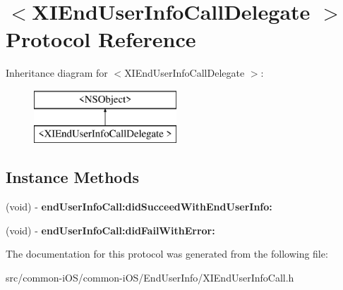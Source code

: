 \hypertarget{protocol_x_i_end_user_info_call_delegate_01-p}{}\section{$<$X\+I\+End\+User\+Info\+Call\+Delegate $>$ Protocol Reference}
\label{protocol_x_i_end_user_info_call_delegate_01-p}
Inheritance diagram for $<$X\+I\+End\+User\+Info\+Call\+Delegate $>$\+:\begin{figure}[H]
\begin{center}
\leavevmode
\includegraphics[height=2.000000cm]{protocol_x_i_end_user_info_call_delegate_01-p}
\end{center}
\end{figure}
\subsection*{Instance Methods}
\begin{DoxyCompactItemize}
\item 
\hypertarget{protocol_x_i_end_user_info_call_delegate_01-p_adfc089c81e0ddc50514f1074d048017d}{}\label{protocol_x_i_end_user_info_call_delegate_01-p_adfc089c81e0ddc50514f1074d048017d} 
(void) -\/ {\bfseries end\+User\+Info\+Call\+:did\+Succeed\+With\+End\+User\+Info\+:}
\item 
\hypertarget{protocol_x_i_end_user_info_call_delegate_01-p_a6599578ecbaf456142bfc885f4440f9b}{}\label{protocol_x_i_end_user_info_call_delegate_01-p_a6599578ecbaf456142bfc885f4440f9b} 
(void) -\/ {\bfseries end\+User\+Info\+Call\+:did\+Fail\+With\+Error\+:}
\end{DoxyCompactItemize}


The documentation for this protocol was generated from the following file\+:\begin{DoxyCompactItemize}
\item 
src/common-\/i\+O\+S/common-\/i\+O\+S/\+End\+User\+Info/X\+I\+End\+User\+Info\+Call.\+h\end{DoxyCompactItemize}
